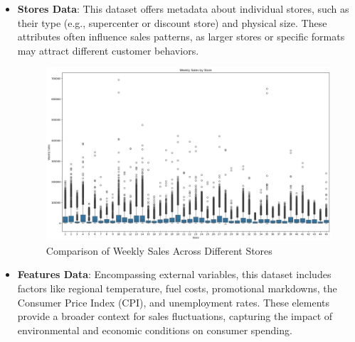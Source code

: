 \begin{itemize}
    \item \textbf{Stores Data}: This dataset offers metadata about individual stores, such as their type (e.g., supercenter or discount store) and physical size. These attributes often influence sales patterns, as larger stores or specific formats may attract different customer behaviors.
    \begin{figure}[h]
        \centering
        \includegraphics[width=0.8\linewidth]{latex/figures_adarsh/Weekly_Sale_by_Store.png}
        \caption{Comparison of Weekly Sales Across Different Stores}
        \label{fig:sales_by_store}
    \end{figure}
    
    \item \textbf{Features Data}: Encompassing external variables, this dataset includes factors like regional temperature, fuel costs, promotional markdowns, the Consumer Price Index (CPI), and unemployment rates. These elements provide a broader context for sales fluctuations, capturing the impact of environmental and economic conditions on consumer spending.
\end{itemize}


